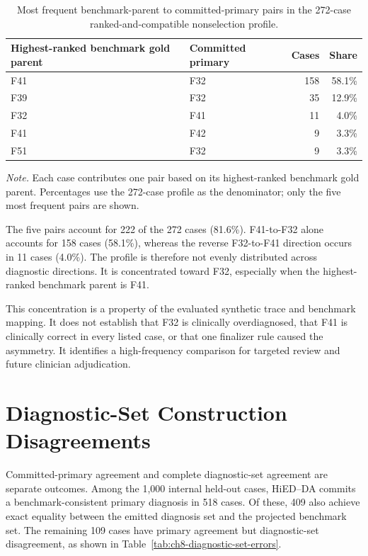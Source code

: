 \begin{table}[htbp]
\centering
\caption{Most frequent benchmark-parent to committed-primary pairs in the 272-case ranked-and-compatible nonselection profile.}
\label{tab:ch8-selection-pairs}
\small
\begin{tabularx}{\textwidth}{|>{\raggedright\arraybackslash}X|>{\raggedright\arraybackslash}p{3.2cm}|r|r|}
\hline
Highest-ranked benchmark gold parent & Committed primary & Cases & Share\\
\hline
F41 & F32 & 158 & 58.1\%\\
F39 & F32 & 35 & 12.9\%\\
F32 & F41 & 11 & 4.0\%\\
F41 & F42 & 9 & 3.3\%\\
F51 & F32 & 9 & 3.3\%\\
\hline
\end{tabularx}
\parbox{0.96\textwidth}{\footnotesize
\textit{Note.} Each case contributes one pair based on its highest-ranked benchmark gold parent. Percentages use the 272-case profile as the denominator; only the five most frequent pairs are shown.
}
\end{table}

The five pairs account for 222 of the 272 cases (81.6\%). F41-to-F32 alone accounts for 158 cases (58.1\%), whereas the reverse F32-to-F41 direction occurs in 11 cases (4.0\%). The profile is therefore not evenly distributed across diagnostic directions. It is concentrated toward F32, especially when the highest-ranked benchmark parent is F41.

This concentration is a property of the evaluated synthetic trace and benchmark mapping. It does not establish that F32 is clinically overdiagnosed, that F41 is clinically correct in every listed case, or that one finalizer rule caused the asymmetry. It identifies a high-frequency comparison for targeted review and future clinician adjudication.

\section{Diagnostic-Set Construction Disagreements}
\label{sec:ch8-diagnostic-set}
\label{sec:ch8-set-formation}

Committed-primary agreement and complete diagnostic-set agreement are separate outcomes. Among the 1,000 internal held-out cases, HiED--DA commits a benchmark-consistent primary diagnosis in 518 cases. Of these, 409 also achieve exact equality between the emitted diagnosis set and the projected benchmark set. The remaining 109 cases have primary agreement but diagnostic-set disagreement, as shown in Table~\ref{tab:ch8-diagnostic-set-errors}.

